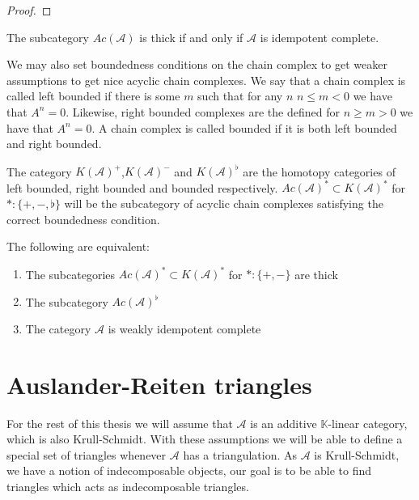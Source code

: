     \begin{proof}
        
    \end{proof}

    \begin{corollary}
        The subcategory $Ac(\mathcal{A})$ is thick if and only if $\mathcal{A}$ is idempotent complete.
    \end{corollary}

    We may also set boundedness conditions on the chain complex to get weaker assumptions to get nice acyclic chain complexes. We say that a chain complex is called left bounded if there is some $m$ such that for any $n$ $n\leq m<0$ we have that $A^n = 0$. Likewise, right bounded complexes are the defined for $n\geq m>0$ we have that $A^n=0$. A chain complex is called bounded if it is both left bounded and right bounded. 

    \begin{definition}
        The category $K(\mathcal{A})^+$,$K(\mathcal{A})^-$ and $K(\mathcal{A})^{\flat}$ are the homotopy categories of left bounded, right bounded and bounded respectively. $Ac(\mathcal{A})^* \subset K(\mathcal{A})^*$ for $*:\{+,-,\flat\}$ will be the subcategory of acyclic chain complexes satisfying the correct boundedness condition.
    \end{definition}

    \begin{lemma}
        The following are equivalent:
        \begin{enumerate}
            \item The subcategories $Ac(\mathcal{A})^* \subset K(\mathcal{A})^*$ for $*:\{+,-\}$ are thick
            \item The subcategory $Ac(\mathcal{A})^{\flat}$
            \item The category $\mathcal{A}$ is weakly idempotent complete
        \end{enumerate}
    \end{lemma}

\section{Auslander-Reiten triangles}

    For the rest of this thesis we will assume that $\mathcal{A}$ is an additive $\mathbb{K}$-linear category, which is also Krull-Schmidt. With these assumptions we will be able to define a special set of triangles whenever $\mathcal{A}$ has a triangulation. As $\mathcal{A}$ is Krull-Schmidt, we have a notion of indecomposable objects, our goal is to be able to find triangles which acts as indecomposable triangles.

